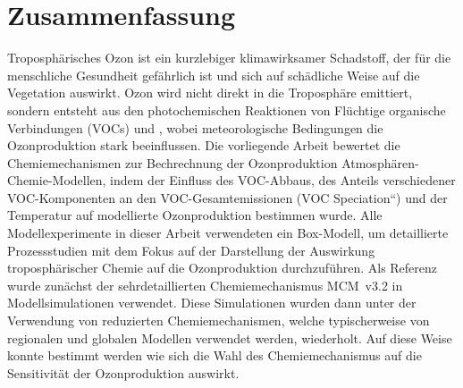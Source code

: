 \section{Zusammenfassung}
Troposphärisches Ozon ist ein kurzlebiger klimawirksamer Schadstoff, der für die menschliche Gesundheit gefährlich ist und sich auf schädliche Weise auf die Vegetation auswirkt.
Ozon wird nicht direkt in die Troposphäre emittiert, sondern entsteht aus den photochemischen Reaktionen von Flüchtige organische Verbindungen (VOCs) und , wobei meteorologische Bedingungen die Ozonproduktion stark beeinflussen.
Die vorliegende Arbeit bewertet die Chemiemechanismen zur Bechrechnung der Ozonproduktion Atmosphären-Chemie-Modellen, indem der Einfluss des VOC-Abbaus, des Anteils verschiedener VOC-Komponenten an den VOC-Gesamtemissionen (\quotedblbase VOC Speciation``) und der Temperatur auf modellierte Ozonproduktion bestimmen wurde.
Alle Modellexperimente in dieser Arbeit verwendeten ein Box-Modell, um detaillierte Prozessstudien mit dem Fokus auf der Darstellung der Auswirkung troposphärischer Chemie auf die Ozonproduktion durchzuführen.
Als Referenz wurde zunächst der sehrdetaillierten Chemiemechanismus MCM~v3.2 in Modellsimulationen verwendet.
Diese Simulationen wurden dann unter der Verwendung von reduzierten Chemiemechanismen, welche typischerweise von regionalen und globalen Modellen verwendet werden, wiederholt. 
Auf diese Weise konnte bestimmt werden wie sich die Wahl des Chemiemechanismus auf die Sensitivität der Ozonproduktion auswirkt.

